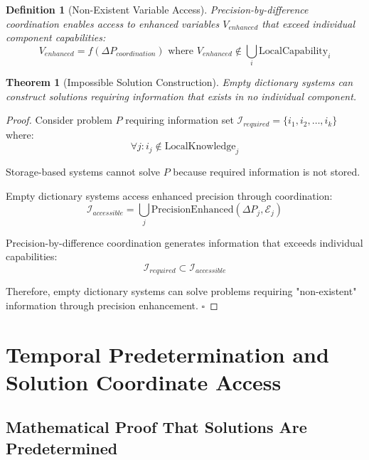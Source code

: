 \documentclass[12pt,a4paper]{article}
\newtheorem{theorem}{Theorem}
\newtheorem{definition}{Definition}
\begin{document}
\begin{definition}[Non-Existent Variable Access]
Precision-by-difference coordination enables access to enhanced variables $V_{enhanced}$ that exceed individual component capabilities:
\begin{equation}
V_{enhanced} = f(\Delta P_{coordination}) \text{ where } V_{enhanced} \notin \bigcup_{i} \text{LocalCapability}_i
\end{equation}
\end{definition}

\begin{theorem}[Impossible Solution Construction]
Empty dictionary systems can construct solutions requiring information that exists in no individual component.
\end{theorem}

\begin{proof}
Consider problem $P$ requiring information set $\mathcal{I}_{required} = \{i_1, i_2, \ldots, i_k\}$ where:
\begin{equation}
\forall j : i_j \notin \text{LocalKnowledge}_j
\end{equation}

Storage-based systems cannot solve $P$ because required information is not stored.

Empty dictionary systems access enhanced precision through coordination:
\begin{equation}
\mathcal{I}_{accessible} = \bigcup_{j} \text{PrecisionEnhanced}(\Delta P_j, \mathcal{E}_j)
\end{equation}

Precision-by-difference coordination generates information that exceeds individual capabilities:
\begin{equation}
\mathcal{I}_{required} \subset \mathcal{I}_{accessible}
\end{equation}

Therefore, empty dictionary systems can solve problems requiring "non-existent" information through precision enhancement. $\square$
\end{proof}

\section{Temporal Predetermination and Solution Coordinate Access}

\subsection{Mathematical Proof That Solutions Are Predetermined}
\end{document}
